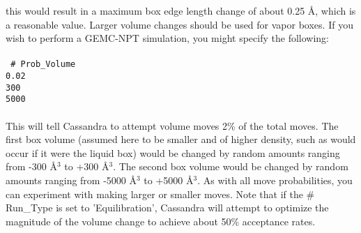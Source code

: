 this would result in a maximum box edge length change of about 0.25
\AA, which is a reasonable value.  
Larger volume changes should be used for vapor boxes. 
%
If you wish to perform a GEMC-NPT simulation, you might specify the
following: \\ \\ 
%                                                                                                                                           
\texttt{
\# Prob\_Volume \\
0.02 \\
300 \\
5000} \\ \\
%
This will tell Cassandra to attempt volume moves 2\% of the
total moves. The first box volume (assumed here to be smaller and of higher
density, such as would occur if it were the liquid box) would be
changed by random amounts ranging from 
-300 \AA $^3$ to +300 \AA $^3$. The second box volume would be
changed by random amounts ranging from
-5000 \AA $^3$ to +5000 \AA $^3$. As with all move probabilities, you
can experiment with making 
larger or smaller moves. Note that if the \# Run\_Type is set
to 'Equilibration', Cassandra will attempt to optimize the magnitude of
the volume change to achieve about 50\% acceptance rates. 
%                                                                                                                                           
%                
%
%
